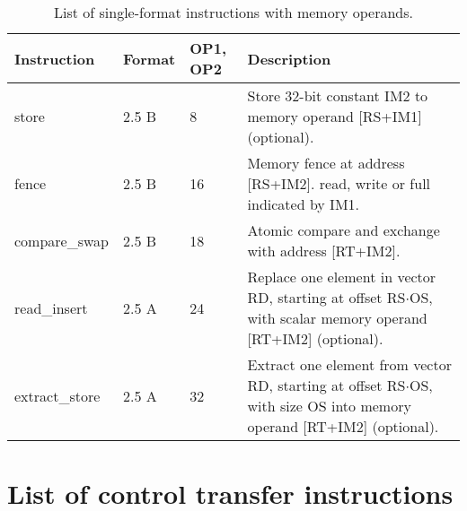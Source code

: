 \documentclass[forwardcom.tex]{subfiles}
\begin{document}
\begin{longtable} {|p{25mm}|p{12mm}|p{12mm}|p{95mm}|}
\caption{List of single-format instructions with memory operands.} 
\label{table:ListOfSingleFormatInstructionsMemory} \\
\endfirsthead
\endhead
\hline
\bfseries Instruction & \bfseries Format &\bfseries OP1, OP2 & \bfseries Description \\
\hline
store         & 2.5 B &  8 & Store 32-bit constant IM2 to memory operand [RS+IM1] (optional). \\

fence         & 2.5 B & 16 & Memory fence at address [RS+IM2]. read, write or full indicated by IM1.\\

compare\_swap & 2.5 B & 18 & Atomic compare and exchange with address [RT+IM2].\\

read\_insert  & 2.5 A & 24 & Replace one element in vector RD, starting at offset 
RS$\cdot$OS, with scalar memory operand [RT+IM2] (optional).  \\

extract\_store& 2.5 A & 32 & Extract one element from vector RD, starting at offset RS$\cdot$OS, with size OS into memory operand [RT+IM2] (optional). \\

\hline
\end{longtable}
\vspace{4mm}



\section{List of control transfer instructions}
\end{document}
